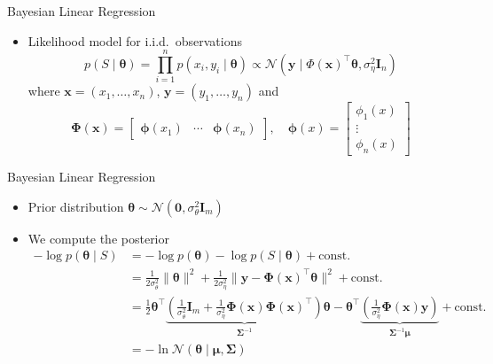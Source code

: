 \documentclass[aspectratio=169]{beamer}
\begin{document}
\begin{frame}{Bayesian Linear Regression}
  \begin{itemize}
    \item
      Likelihood model for i.i.d.\ observations
      \begin{equation*}
        p(S \mid \bm{\theta}) = \prod_{i = 1}^n p(x_i, y_i \mid \bm{\theta}) 
        \propto \mathcal{N}(\bm{y} \mid \Phi(\bm{x})^\top \bm{\theta},
        \sigma_\eta^2 \mathbf{I}_n)
      \end{equation*}
      where $\bm{x} = (x_1, \ldots, x_n)$, $\bm{y} = (y_1, \ldots, y_n)$ and
      \begin{equation*}
        \mathbf{\Phi}(\bm{x}) =
        \begin{bmatrix}
          \bm{\phi}(x_1) & \cdots & \bm{\phi}(x_n)
        \end{bmatrix},
        \quad \bm{\phi}(x) =
        \begin{bmatrix}
          \phi_1(x) \\
          \vdots \\
          \phi_n(x)
        \end{bmatrix}
      \end{equation*}
  \end{itemize}
\end{frame}

\begin{frame}{Bayesian Linear Regression}
  \begin{itemize}
    \item
      Prior distribution $\bm{\theta} \sim \mathcal{N}(\bm{0}, \sigma_\theta^2
      \mathbf{I}_m)$
    \item
      We compute the posterior
      \begin{equation*}
        \begin{split}
          -\log p(\bm{\theta} \mid S)
          &= -\log p(\bm{\theta}) - \log p(S \mid \bm{\theta}) + \text{const.}
          \\
          &= \frac{1}{2 \sigma_\theta^2} \| \bm{\theta} \|^2 + \frac{1}{2
          \sigma_\eta^2} \| \bm{y} - \mathbf{\Phi}(\bm{x})^\top \bm{\theta} \|^2
          + \text{const.}
          \\
          &= \frac{1}{2} \bm{\theta}^\top
          \underbrace{\left(\frac{1}{\sigma_\theta^2} \mathbf{I}_m +
          \frac{1}{\sigma_\eta^2} \mathbf{\Phi}(\bm{x})
          \mathbf{\Phi}(\bm{x})^\top\right)}_{\mathbf{\Sigma}^{-1}} \bm{\theta}
          - \bm{\theta}^\top \underbrace{\left(\frac{1}{\sigma_\eta^2}
          \mathbf{\Phi}(\bm{x}) \bm{y}\right)}_{\mathbf{\Sigma}^{-1} \bm{\mu}} +
          \text{const.}
          \\
          &= -\ln \mathcal{N}(\bm{\theta} \mid \bm{\mu}, \mathbf{\Sigma})
        \end{split}
      \end{equation*}
  \end{itemize}
\end{frame}
\end{document}
